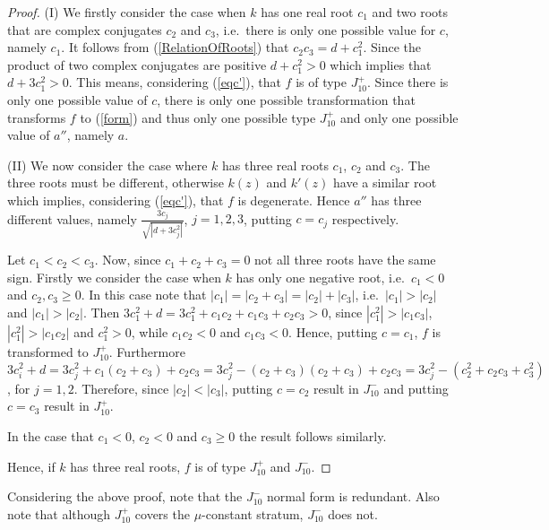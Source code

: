 \documentclass[noend]{amsproc}
\theoremstyle{definition}
\begin{document}
\begin{proof}
(I) We firstly consider the case when $k$ has one real root $c_1$ and two roots that are complex conjugates $c_2$ and $c_3$, i.e.~there is only one possible value for $c$, namely $c_1$. It follows from (\ref{RelationOfRoots}) that $c_2c_3=d+c_1^2$. Since the product of two complex conjugates are positive $d+c_1^2>0$ which implies that $d+3c_1^2>0$. This means, considering (\ref{eqc'}), that $f$ is of type $J_{10}^+$. Since there is only one possible value of $c$, there is only one possible transformation that transforms $f$ to (\ref{form}) and thus only one possible type $J_{10}^+$ and only one possible value of $a''$, namely $a$.

(II) We now consider the case where $k$ has three real roots $c_1$, $c_2$ and $c_3$. The three roots must be different, otherwise $k(z)$ and $k'(z)$ have a similar root which implies, considering (\ref{eqc'}), that $f$ is degenerate. Hence $a''$ has three different values, namely $\frac{3c_j}{\sqrt{|d+3c_j^2|}}$, $j=1,2,3$, putting $c=c_j$ respectively.

Let $c_1<c_2<c_3$. Now, since $c_1+c_2+c_3=0$ not all three roots have the same sign. Firstly we consider the case when $k$ has only one negative root, i.e.~$c_1<0$ and $c_2,c_3\ge 0$. In this case note that $|c_1|=|c_2+c_3|=|c_2|+|c_3|$, i.e.~$|c_1|>|c_2|$ and $|c_1|>|c_2|$. Then $3c_1^2+d=3c_1^2+c_1c_2+c_1c_3+c_2c_3>0$, since $|c_1^2|>|c_1c_3|$, $|c_1^2|>|c_1c_2|$ and $c_1^2>0$, while $c_1c_2<0$ and $c_1c_3<0$. Hence, putting $c=c_1$, $f$ is transformed to $J_{10}^+$.
Furthermore $3c_i^2+d=3c_j^2+c_1(c_2+c_3)+c_2c_3=3c_j^2-(c_2+c_3)(c_2+c_3)+c_2c_3=3c_j^2-(c_2^2+c_2c_3+c_3^2)$, for $j=1,2$. Therefore, since $|c_2|<|c_3|$, putting $c=c_2$ result in $J_{10}^-$ and putting $c=c_3$ result in $J_{10}^+$.

In the case that $c_1<0$, $c_2<0$ and $c_3\ge 0$ the result follows similarly. 

Hence, if $k$ has three real roots, $f$ is of type $J_{10}^+$ and $J_{10}^-$. 
\end{proof}

Considering the above proof, note that the $J_{10}^-$ normal form is redundant. Also note that although $J_{10}^+$ covers the $\mu$-constant stratum, $J_{10}^-$ does not.
\newpage
\end{document}
